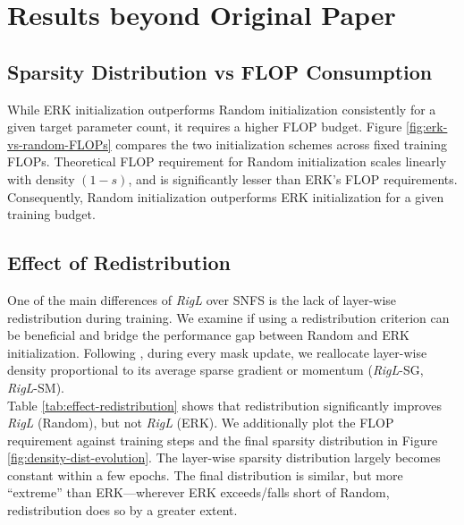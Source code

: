 \section{Results beyond Original Paper}
 
\subsection{Sparsity Distribution vs FLOP Consumption}\label{effect-sparsity-distribution}



While ERK initialization outperforms Random initialization consistently for a given target parameter count, it requires a higher FLOP budget. Figure \ref{fig:erk-vs-random-FLOPs} compares the two initialization schemes across fixed training FLOPs. Theoretical FLOP requirement for Random initialization scales linearly with density $(1-s)$, and is significantly lesser than ERK's FLOP requirements. Consequently, Random initialization outperforms ERK initialization for a given training budget.

\subsection{Effect of Redistribution}\label{effect-redistribution}



One of the main differences of \textit{RigL} over SNFS is the lack of layer-wise redistribution during training. We examine if using a redistribution criterion can be beneficial and bridge the performance gap between Random and ERK initialization. Following \citet{dettmers2020sparse}, during every mask update, we reallocate layer-wise density proportional to its average sparse gradient or momentum (\textit{RigL}-SG, \textit{RigL}-SM).\\
 
Table \ref{tab:effect-redistribution} shows that redistribution significantly improves \textit{RigL} (Random), but not \textit{RigL} (ERK). We additionally plot the FLOP requirement against training steps and the final sparsity distribution in Figure \ref{fig:density-dist-evolution}. The layer-wise sparsity distribution largely becomes constant within a few epochs. The final distribution is similar, but more ``extreme'' than ERK---wherever ERK exceeds/falls short of Random, redistribution does so by a greater extent.\\


